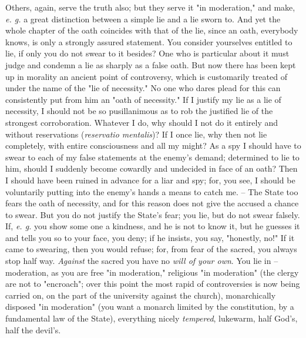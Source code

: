 \documentclass[a4paper]{book}
\begin{document}
Others, again, serve the truth also; but they serve it "{}in moderation,"{} 
and make, \textit{e. g.} a great distinction between a simple lie and a lie 
sworn to. And yet the whole chapter of the oath coincides with that of the 
lie, since an oath, everybody knows, is only a strongly assured statement. You 
consider yourselves entitled to lie, if only you do not swear to it besides? 
One who is particular about it must judge and condemn a lie as sharply as a 
false oath. But now there has been kept up in morality an ancient point of 
controversy, which is customarily treated of under the name of the "{}lie of 
necessity."{} No one who dares plead for this can consistently put from him an 
"{}oath of necessity."{} If I justify my lie as a lie of necessity, I should 
not be so pusillanimous as to rob the justified lie of the strongest 
corroboration. Whatever I do, why should I not do it entirely and without 
reservations (\textit{reservatio mentalis})? If I once lie, why then not lie 
completely, with entire consciousness and all my might? As a spy I should have 
to swear to each of my false statements at the enemy's demand; determined to 
lie to him, should I suddenly become cowardly and undecided in face of an 
oath? Then I should have been ruined in advance for a liar and spy; for, you 
see, I should be voluntarily putting into the enemy's hands a means to catch 
me. -- The State too fears the oath of necessity, and for this reason does not 
give the accused a chance to swear. But you do not justify the State's fear; 
you lie, but do not swear falsely. If, \textit{e. g.} you show some one a 
kindness, and he is not to know it, but he guesses it and tells you so to your 
face, you deny; if he insists, you say, "{}honestly, no!"{} If it came to 
swearing, then you would refuse; for, from fear of the sacred, you always stop 
half way. \textit{Against} the sacred you have no \textit{will of your own}. 
You lie in -- moderation, as you are free "{}in moderation,"{} religious "{}in 
moderation"{} (the clergy are not to "{}encroach"{}; over this point the most 
rapid of controversies is now being carried on, on the part of the university 
against the church), monarchically disposed "{}in moderation"{} (you want a 
monarch limited by the constitution, by a fundamental law of the State), 
everything nicely \textit{tempered}, lukewarm, half God's, half the devil's.
\end{document}

